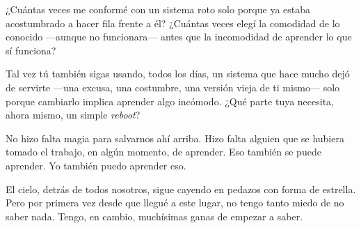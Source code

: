 ¿Cuántas veces me conformé con un sistema roto solo porque ya estaba acostumbrado a hacer fila frente a él? ¿Cuántas veces elegí la comodidad de lo conocido —aunque no funcionara— antes que la incomodidad de aprender lo que sí funciona?

Tal vez tú también sigas usando, todos los días, un sistema que hace mucho dejó de servirte —una excusa, una costumbre, una versión vieja de ti mismo— solo porque cambiarlo implica aprender algo incómodo. ¿Qué parte tuya necesita, ahora mismo, un simple \emph{reboot}?

No hizo falta magia para salvarnos ahí arriba. Hizo falta alguien que se hubiera tomado el trabajo, en algún momento, de aprender. Eso también se puede aprender. Yo también puedo aprender eso.

El cielo, detrás de todos nosotros, sigue cayendo en pedazos con forma de estrella. Pero por primera vez desde que llegué a este lugar, no tengo tanto miedo de no saber nada. Tengo, en cambio, muchísimas ganas de empezar a saber.
